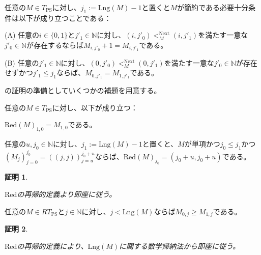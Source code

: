\documentclass[dvipdfmx,uplatex]{jsarticle}
\theoremstyle{customnonumberbreakfortheorem}
\theoremstyle{customnonumberbreakforproof}
\newtheorem{hideableproof}{証明}
\begin{document}
\begin{proposition}[簡約性と係数の関係]\label{簡約性と係数の関係}
	任意の\(M \in T_{\textrm{PS}}\)に対し、\(j_1 := \textrm{Lng}(M)-1\)と置くと\(M\)が簡約である必要十分条件は以下が成り立つことである：
	\begin{indented}
		\item[(A)] 任意の\(i \in \{0,1\}\)と\(j'_1 \in \mathbb{N}\)に対し、\((i,j'_0) <_M^{\textrm{Next}} (i,j'_1)\)を満たす一意な\(j'_0 \in \mathbb{N}\)が存在するならば\(M_{i,j'_0}+1 = M_{i,j'_1}\)である。
		\item[(B)] 任意の\(j'_1 \in \mathbb{N}\)に対し、\((0,j'_0) <_M^{\textrm{Next}} (0,j'_1)\)を満たす一意な\(j'_0 \in \mathbb{N}\)が存在せずかつ\(j'_1 \leq j_1\)ならば、\(M_{0,j'_1} = M_{1,j'_1}\)である。
	\end{indented}
\end{proposition}

の証明の準備としていくつかの補題を用意する。

\begin{lemma}[Redと左端の関係]\label{Redと左端の関係}
	任意の\(M \in T_{\textrm{PS}}\)に対し、以下が成り立つ：
	\begin{penumerate}
		\item \(\textrm{Red}(M)_{1,0} = M_{1,0}\)である。
		\item 任意の\(u,j_0 \in \mathbb{N}\)に対し、\(j_1 := \textrm{Lng}(M)-1\)と置くと、\(M\)が単項かつ\(j_0 \leq j_1\)かつ\((M_j)_{j=0}^{j_0} = ((j,j))_{j=u}^{j_0+u}\)ならば、\(\textrm{Red}(M)_{j_0} = (j_0+u,j_0+u)\)である。
	\end{penumerate}
\end{lemma}

\begin{hideableproof}
	\begin{indented}
		\item \(\textrm{Red}\)の再帰的定義より即座に従う。
	\end{indented}
\end{hideableproof}

\begin{lemma}[簡約性と係数の基本性質]\label{簡約性と係数の基本性質}
	任意の\(M \in RT_{\textrm{PS}}\)と\(j \in \mathbb{N}\)に対し、\(j < \textrm{Lng}(M)\)ならば\(M_{0,j} \geq M_{1,j}\)である。
\end{lemma}

\begin{hideableproof}
	\begin{indented}
		\item \(\textrm{Red}\)の再帰的定義により、\(\textrm{Lng}(M)\)に関する数学帰納法から即座に従う。
	\end{indented}
\end{hideableproof}
\end{document}
